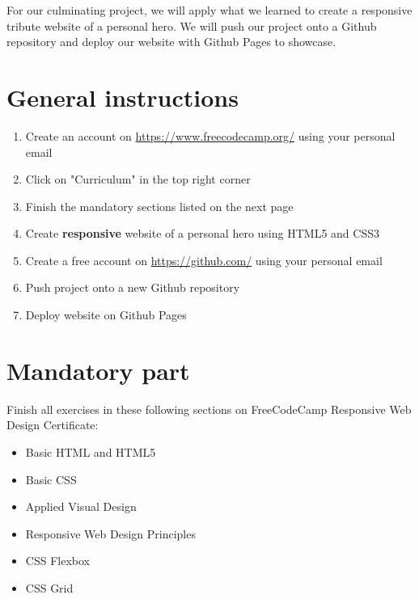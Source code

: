 \documentclass{42-en}
\begin{document}
For our culminating project, we will apply what we learned to create a responsive tribute website of a personal hero. We will push our project onto a Github repository and deploy our website with Github Pages to showcase.



\chapter{General instructions}

\begin{enumerate}
    \item Create an account on \url{https://www.freecodecamp.org/} using your personal email
    \item Click on "Curriculum" in the top right corner
    \item Finish the mandatory sections listed on the next page
    \item Create \textbf{responsive} website of a personal hero using HTML5 and CSS3
    \item Create a free account on \url{https://github.com/} using your personal email
    \item Push project onto a new Github repository
    \item Deploy website on Github Pages
\end{enumerate}
   
    



\chapter{Mandatory part}

Finish all exercises in these following sections on FreeCodeCamp Responsive Web Design Certificate:
\begin{itemize}
    \item Basic HTML and HTML5
    \item Basic CSS
    \item Applied Visual Design
    \item Responsive Web Design Principles
    \item CSS Flexbox
    \item CSS Grid
\end{itemize}
\vspace{0.2in}
\end{document}
